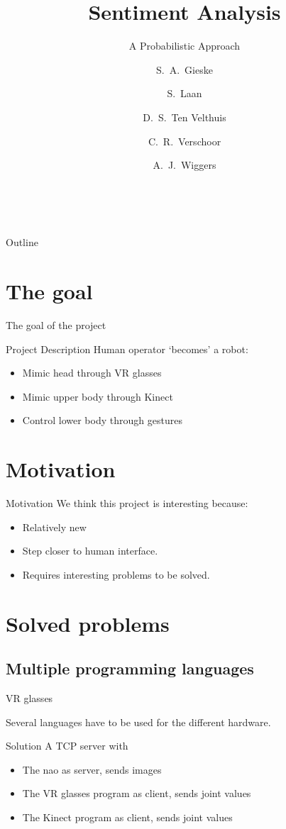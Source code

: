 \documentclass{beamer}
\title[Sentiment Analysis]
{Sentiment Analysis}
\subtitle{A Probabilistic Approach}
\author[Gieske, Laan, Ten Velthuis, Verschoor, Wiggers] %
{S.~A.~Gieske \and S.~Laan \and D.~S.~Ten Velthuis \and C.~R.~Verschoor \and A.~J.~Wiggers}
\institute[University of Amsterdam] %
{
  Faculty of Science (FNWI) \\
  University of Amsterdam
}
\begin{document}
\begin{frame}
  \titlepage
\end{frame}

\begin{frame}{Outline}
  \tableofcontents
\end{frame}


\section{The goal}

\begin{frame}{The goal of the project}
\begin{block}{Project Description}
Human operator `becomes' a robot:
\end{block}
\begin{itemize}
\item Mimic head through VR glasses
\item Mimic upper body through Kinect
\item Control lower body through gestures
\end{itemize}
\end{frame}

\section{Motivation}

\begin{frame}{Motivation}
We think this project is interesting because:\\
\begin{itemize}
\item<2-> Relatively new
\item<3-> Step closer to human interface.
\item<4-> Requires interesting problems to be solved.
\end{itemize}
\end{frame}

\section{Solved problems}

\subsection{Multiple programming languages}
\begin{frame}[t]{VR glasses}
\begin{block}Several languages have to be used for the different hardware.
\end{block}
\pause
\begin{block}{Solution}
A TCP server with
\begin{itemize}
\item The nao as server, sends images
\item The VR glasses program as client, sends joint values
\item The Kinect program as client, sends joint values
\end{itemize}
\end{block}
\end{frame}
\end{document}

